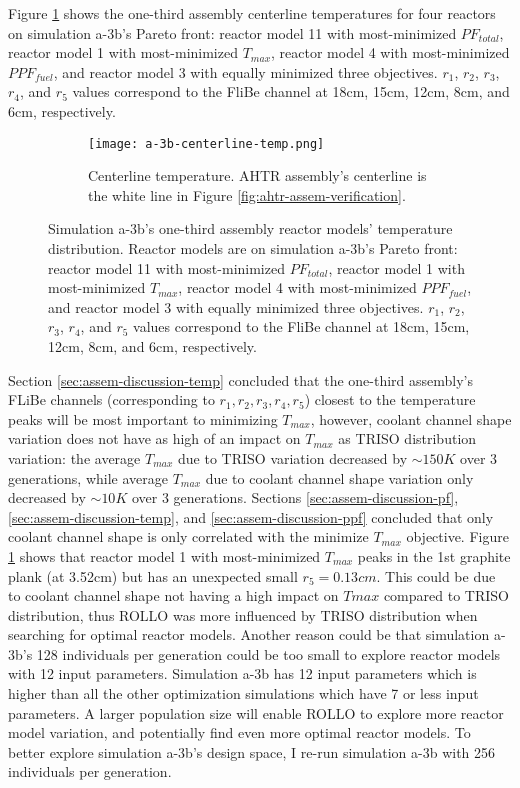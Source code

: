 Figure \ref{fig:a-3b-centerline-temp} shows the one-third assembly centerline 
temperatures for four reactors on simulation a-3b's Pareto front: reactor model 11 
with most-minimized $PF_{total}$, reactor model 1 with most-minimized $T_{max}$, 
reactor model 4 with most-minimized $PPF_{fuel}$, and reactor model 3 with equally 
minimized three objectives. 
$r_1$, $r_2$, $r_3$, $r_4$, and $r_5$ values correspond to the FliBe channel at 18cm, 
15cm, 12cm, 8cm, and 6cm, respectively.  
\begin{figure}[htbp!]
    \begin{subfigure}{\textwidth}
        \centering
        \texttt{[image: a-3b-centerline-temp.png]}
        \caption{Centerline temperature. AHTR assembly's centerline is the white line 
        in Figure \ref{fig:ahtr-assem-verification}.}
        \label{fig:a-3b-centerline-temp} 
    \end{subfigure}
    \caption{Simulation a-3b's one-third assembly reactor models' temperature 
    distribution. Reactor models are on simulation a-3b's Pareto front: 
    reactor model 11 with most-minimized $PF_{total}$, 
    reactor model 1 with most-minimized $T_{max}$, 
    reactor model 4 with most-minimized $PPF_{fuel}$, and 
    reactor model 3 with equally minimized three objectives. 
    $r_1$, $r_2$, $r_3$, $r_4$, and $r_5$ values correspond to the FliBe channel at 18cm, 
    15cm, 12cm, 8cm, and 6cm, respectively.  }
    \label{fig:a-3b-temp-distribution}
\end{figure}
Section \ref{sec:assem-discussion-temp} concluded that the one-third assembly's FLiBe 
channels (corresponding to $r_1, r_2, r_3, r_4, r_5$) closest to the temperature peaks 
will be most important to minimizing $T_{max}$, however, coolant channel shape variation 
does not have as high of an impact on $T_{max}$ as \gls{TRISO} distribution variation: 
the average $T_{max}$ due to \gls{TRISO} variation decreased by $\sim150K$ over 3 
generations, while average $T_{max}$ due to coolant channel shape variation only 
decreased by $\sim10K$ over 3 generations. 
Sections \ref{sec:assem-discussion-pf}, \ref{sec:assem-discussion-temp}, and 
\ref{sec:assem-discussion-ppf} concluded that only coolant channel shape is only 
correlated with the minimize $T_{max}$ objective. 
Figure \ref{fig:a-3b-centerline-temp} shows that reactor model 1 with most-minimized 
$T_{max}$ peaks in the 1st graphite plank (at 3.52cm) but has an unexpected small 
$r_5 = 0.13cm$.
This could be due to coolant channel shape not having a high impact on $T{max}$ compared 
to TRISO distribution, thus \gls{ROLLO} was more influenced by TRISO distribution when 
searching for optimal reactor models. 
Another reason could be that simulation a-3b's 128 individuals per generation could be 
too small to explore reactor models with 12 input parameters. 
Simulation a-3b has 12 input parameters which is higher than all the other optimization 
simulations which have 7 or less input parameters. 
A larger population size will enable \gls{ROLLO} to explore more reactor model variation, 
and potentially find even more optimal reactor models. 
To better explore simulation a-3b's design space, I re-run simulation a-3b with 
256 individuals per generation. 

